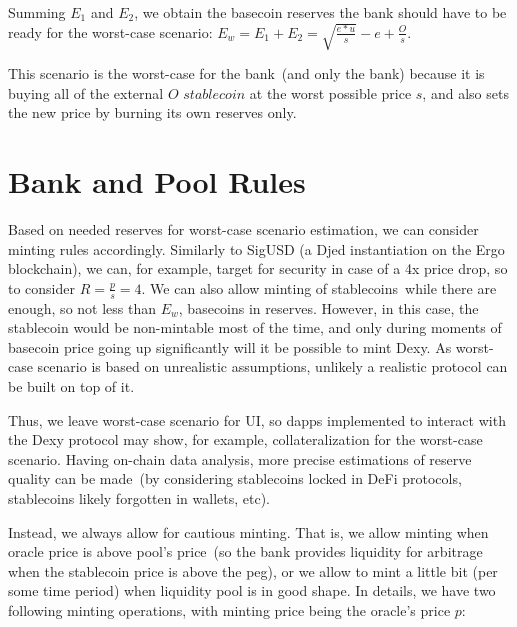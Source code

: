 \documentclass[a4paper,UKenglish,cleveref, autoref, thm-restate]{lipics-v2021}
\newcommand{\sct}{stablecoin}
\newcommand{\dx}{Dexy}
\begin{document}
Summing $E_1$ and $E_2$, we obtain the basecoin reserves the bank should have to be ready for the worst-case scenario: $E_w = E_1 + E_2 = \sqrt{\frac{e * u}{s}} - e + \frac{O}{s}$.

This scenario is the worst-case for the bank~(and only the bank) because it is buying all of the external $O$ $\sct{}$ at the worst possible price $s$, and also sets the new price by burning its own reserves only.  

\section{Bank and Pool Rules}
\label{sec:detailed-rules}

Based on needed reserves for worst-case scenario estimation, we can consider minting rules accordingly. Similarly to SigUSD \cite{SigUSD} (a Djed instantiation on the Ergo blockchain), we can, for example, target for security in case of a
4x price drop, so to consider $R = \frac{p}{s} = 4$. 
We can also allow minting of \sct{}s~while there are enough, so not less than $E_w$, basecoins in reserves. However, in this case, the \sct{} would be non-mintable most of the time, and only during moments of basecoin price going up significantly will it be possible to mint \dx{}. As worst-case scenario is based on unrealistic assumptions, unlikely a realistic protocol can be built on top of it.  

Thus, we leave worst-case scenario for UI, so dapps implemented to interact with the \dx{} protocol may show, for example, collateralization for the worst-case scenario. Having on-chain data analysis, more precise estimations of reserve quality can be made~(by considering \sct{}s locked in DeFi protocols, stablecoins likely forgotten in wallets, etc).

Instead, we always allow for cautious minting. That is, we allow minting when oracle price is above pool's price~(so the bank provides liquidity for arbitrage when the \sct{} price is above the peg), or we allow to mint a little bit (per some time period) when liquidity pool is in good shape. In details, we have two following minting operations, with minting price being the oracle's price $p$:  
\end{document}
